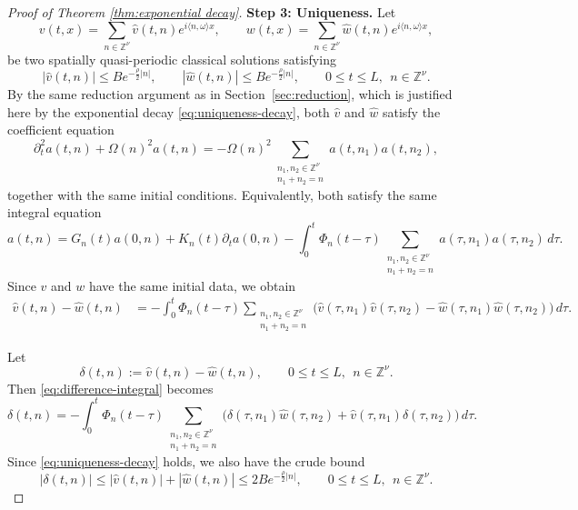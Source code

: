 \documentclass[12pt,reqno,tbtags]{amsart}
\newcommand\1{\mathbbm{1}}
\begin{document}
\begin{proof}[Proof of Theorem \ref{thm:exponential decay}]
\medskip
\noindent
\textbf{Step 3: Uniqueness.}
Let
\[
v(t,x)=\sum_{n\in \mathbb{Z}^{\nu}} \widehat v(t,n)e^{i\langle n,\omega\rangle x},
\qquad
w(t,x)=\sum_{n\in \mathbb{Z}^{\nu}} \widehat w(t,n)e^{i\langle n,\omega\rangle x},
\]
be two spatially quasi-periodic classical solutions satisfying
\begin{equation}\label{eq:uniqueness-decay}
|\widehat v(t,n)|\leq B e^{-\frac{\rho}{2}|n|},
\qquad
|\widehat w(t,n)|\leq B e^{-\frac{\rho}{2}|n|},
\qquad
0\leq t\leq L,\ \ n\in \mathbb{Z}^{\nu}.
\end{equation}
By the same reduction argument as in Section~\ref{sec:reduction}, which is justified
here by the exponential decay \eqref{eq:uniqueness-decay}, both $\widehat v$ and
$\widehat w$ satisfy the coefficient equation
\[
\partial_t^2 a(t,n)+\Omega(n)^2 a(t,n)
=
-\Omega(n)^2
\sum_{\substack{n_1,n_2\in \mathbb{Z}^{\nu}\\ n_1+n_2=n}}
a(t,n_1)a(t,n_2),
\]
together with the same initial conditions. Equivalently, both satisfy the same integral
equation
\[
a(t,n)
=
G_n(t)a(0,n)+K_n(t)\partial_t a(0,n)
-
\int_0^t \Phi_n(t-\tau)
\sum_{\substack{n_1,n_2\in \mathbb{Z}^{\nu}\\ n_1+n_2=n}}
a(\tau,n_1)a(\tau,n_2)\,d\tau .
\]
Since $v$ and $w$ have the same initial data, we obtain
\begin{align}
\widehat v(t,n)-\widehat w(t,n)
&=
-\int_0^t \Phi_n(t-\tau)
\sum_{\substack{n_1,n_2\in \mathbb{Z}^{\nu}\\ n_1+n_2=n}}
\Big(
\widehat v(\tau,n_1)\widehat v(\tau,n_2)
-
\widehat w(\tau,n_1)\widehat w(\tau,n_2)
\Big)\,d\tau .
\label{eq:difference-integral}
\end{align}

Let
\[
\delta(t,n):=\widehat v(t,n)-\widehat w(t,n),
\qquad
0\leq t\leq L,\ \ n\in \mathbb{Z}^{\nu}.
\]
Then \eqref{eq:difference-integral} becomes
\begin{equation}\label{eq:difference-integral-delta}
\delta(t,n)
=
-\int_0^t \Phi_n(t-\tau)
\sum_{\substack{n_1,n_2\in \mathbb{Z}^{\nu}\\ n_1+n_2=n}}
\Big(
\delta(\tau,n_1)\widehat w(\tau,n_2)
+
\widehat v(\tau,n_1)\delta(\tau,n_2)
\Big)\,d\tau .
\end{equation}
Since \eqref{eq:uniqueness-decay} holds, we also have the crude bound
\begin{equation}\label{eq:delta-crude}
|\delta(t,n)|
\leq
|\widehat v(t,n)|+|\widehat w(t,n)|
\leq
2B e^{-\frac{\rho}{2}|n|},
\qquad
0\leq t\leq L,\ \ n\in \mathbb{Z}^{\nu}.
\end{equation}


\end{proof}
\end{document}
